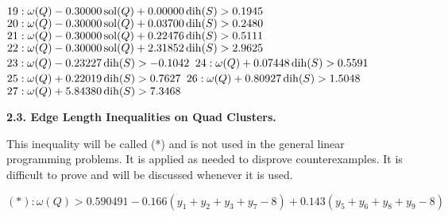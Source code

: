 $19:  \omega(Q) - 0.30000 \operatorname{sol}(Q) + 0.00000 \operatorname{dih}(S) > 0.1945$\newline
$20:  \omega(Q) - 0.30000 \operatorname{sol}(Q) + 0.03700 \operatorname{dih}(S) > 0.2480$\newline
$21:  \omega(Q) - 0.30000 \operatorname{sol}(Q) + 0.22476 \operatorname{dih}(S) > 0.5111$\newline
$22:  \omega(Q) - 0.30000 \operatorname{sol}(Q) + 2.31852 \operatorname{dih}(S) > 2.9625$\newline
$23:  \omega(Q) - 0.23227 \operatorname{dih}(S) > -0.1042$\newline
$24:  \omega(Q) + 0.07448 \operatorname{dih}(S) > 0.5591$\newline
$25:  \omega(Q) + 0.22019 \operatorname{dih}(S) > 0.7627$\newline
$26:  \omega(Q) + 0.80927 \operatorname{dih}(S) > 1.5048$\newline
$27:  \omega(Q) + 5.84380 \operatorname{dih}(S) > 7.3468$\newline



\smallskip

{\bf 2.3. Edge Length Inequalities on Quad Clusters.}

This inequality will be called (*) and is not used in the general linear programming problems.  It is applied as needed to disprove counterexamples.  It is 
difficult to prove and will be discussed whenever it is used.

\smallskip

$(*): \omega(Q) > 0.590491 -0.166(y_1+y_2+y_3+y_7-8) + 0.143 (y_5+y_6+y_8+y_9-8)$\newline

\smallskip


\bye
